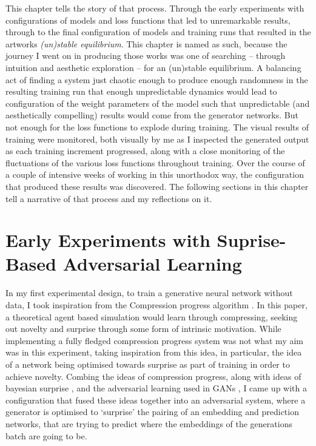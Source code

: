 This chapter tells the story of that process. 
Through the early experiments with configurations of models and loss functions that led to unremarkable results, through to the final configuration of models and training runs that resulted in the artworks \textit{(un)stable equilibrium}.
This chapter is named as such, because the journey I went on in producing those works was one of searching -- through intuition and aesthetic exploration -- for an (un)stable equilibrium. 
A balancing act of finding a system just chaotic enough to produce enough randomness in the resulting training run that enough unpredictable dynamics would lead to configuration of the weight parameters of the model such that unpredictable (and aesthetically compelling) results would come from the generator networks. 
But not enough for the loss functions to explode during training. 
The visual results of training were monitored, both visually by me as I inspected the generated output as each training increment progressed, along with a close monitoring of the fluctuations of the various loss functions throughout training. 
Over the course of a couple of intensive weeks of working in this unorthodox way, the configuration that produced these results was discovered. 
The following sections in this chapter tell a narrative of that process and my reflections on it. 

\section{Early Experiments with Suprise-Based Adversarial Learning}

In my first experimental design, to train a generative neural network without data, I took inspiration from the Compression progress algorithm \citep{schmidhuber2008driven}.
In this paper, a theoretical agent based simulation would learn through compressing, seeking out novelty and surprise through some form of intrinsic motivation. 
While implementing a fully fledged compression progress system was not what my aim was in this experiment, taking inspiration from this idea, in particular, the idea of a network being optimised towards surprise as part of training in order to achieve novelty. 
Combing the ideas of compression progress, along with ideas of bayesian surprise \citep{itti2005bayesian,itti2009bayesian}, and the adversarial learning used in GANs \citep{goodfellow2014generative}, I came up with a configuration that fused these ideas together into an adversarial system, where a generator is optimised to `surprise' the pairing of an embedding and prediction networks, that are trying to predict where the embeddings of the generations batch are going to be.

